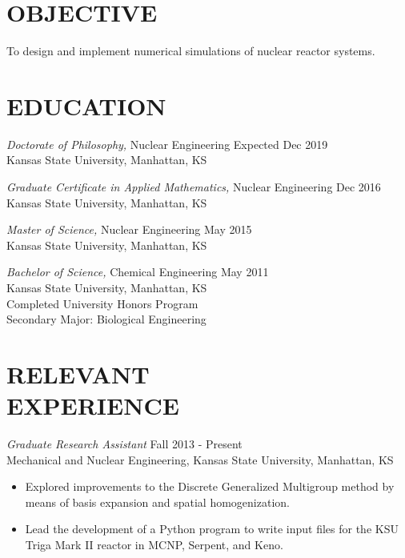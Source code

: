 \documentclass[margin, 10pt]{res} %
\begin{document}
\begin{resume}

\section{OBJECTIVE}

To design and implement numerical simulations of nuclear reactor systems.

\section{EDUCATION}

{\sl Doctorate of Philosophy,} Nuclear Engineering \hfill Expected Dec 2019\\
Kansas State University, Manhattan, KS

{\sl Graduate Certificate in Applied Mathematics,} Nuclear Engineering \hfill Dec 2016\\
Kansas State University, Manhattan, KS

{\sl Master of Science,} Nuclear Engineering \hfill May 2015\\
Kansas State University, Manhattan, KS

{\sl Bachelor of Science,} Chemical Engineering \hfill May 2011 \\
Kansas State University, Manhattan, KS \\
Completed University Honors Program \\
Secondary Major: Biological Engineering

\section{RELEVANT \\ EXPERIENCE}

{\sl Graduate Research Assistant} \hfill Fall 2013 - Present \\
Mechanical and Nuclear Engineering, Kansas State University, Manhattan, KS
\begin{itemize}
    \item Explored improvements to the Discrete Generalized Multigroup method by means of basis expansion and spatial homogenization.
    \item Lead the development of a Python program to write input files for the KSU Triga Mark II reactor in MCNP, Serpent, and Keno.
\end{itemize}


\end{resume}
\end{document}
